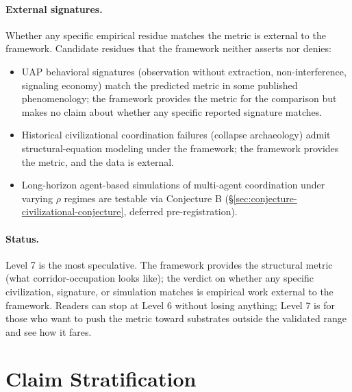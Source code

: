 \documentclass[11pt,a4paper]{article}
\begin{document}
\paragraph{External signatures.} Whether any specific empirical residue matches the metric is external to the framework. Candidate residues that the framework neither asserts nor denies:
\begin{itemize}[leftmargin=*,itemsep=2pt]
  \item UAP behavioral signatures (observation without extraction, non-interference, signaling economy) match the predicted metric in some published phenomenology; the framework provides the metric for the comparison but makes no claim about whether any specific reported signature matches.
  \item Historical civilizational coordination failures (collapse archaeology) admit structural-equation modeling under the framework; the framework provides the metric, and the data is external.
  \item Long-horizon agent-based simulations of multi-agent coordination under varying $\rho$ regimes are testable via Conjecture B (\S\ref{sec:conjecture-civilizational-conjecture}, deferred pre-registration).
\end{itemize}

\paragraph{Status.} Level 7 is the most speculative. The framework provides the structural metric (what corridor-occupation looks like); the verdict on whether any specific civilization, signature, or simulation matches is empirical work external to the framework. Readers can stop at Level 6 without losing anything; Level 7 is for those who want to push the metric toward substrates outside the validated range and see how it fares.

\section{Claim Stratification}
\label{sec:stratification}
\end{document}
